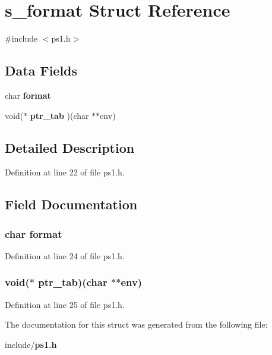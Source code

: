 \section{s\-\_\-format Struct Reference}
\label{structs__format}


{\ttfamily \#include $<$ps1.\-h$>$}

\subsection*{Data Fields}
\begin{DoxyCompactItemize}
\item 
char {\bf format}
\item 
void($\ast$ {\bf ptr\-\_\-tab} )(char $\ast$$\ast$env)
\end{DoxyCompactItemize}


\subsection{Detailed Description}


Definition at line 22 of file ps1.\-h.



\subsection{Field Documentation}
\subsubsection[{format}]{\setlength{\rightskip}{0pt plus 5cm}char format}\label{structs__format_a32fcb6024930af1ae33392a753c59679}


Definition at line 24 of file ps1.\-h.

\subsubsection[{ptr\-\_\-tab}]{\setlength{\rightskip}{0pt plus 5cm}void($\ast$ ptr\-\_\-tab)(char $\ast$$\ast$env)}\label{structs__format_a821d5bfc90f45a86fe06458eca0f3f1e}


Definition at line 25 of file ps1.\-h.



The documentation for this struct was generated from the following file\-:\begin{DoxyCompactItemize}
\item 
include/{\bf ps1.\-h}\end{DoxyCompactItemize}

